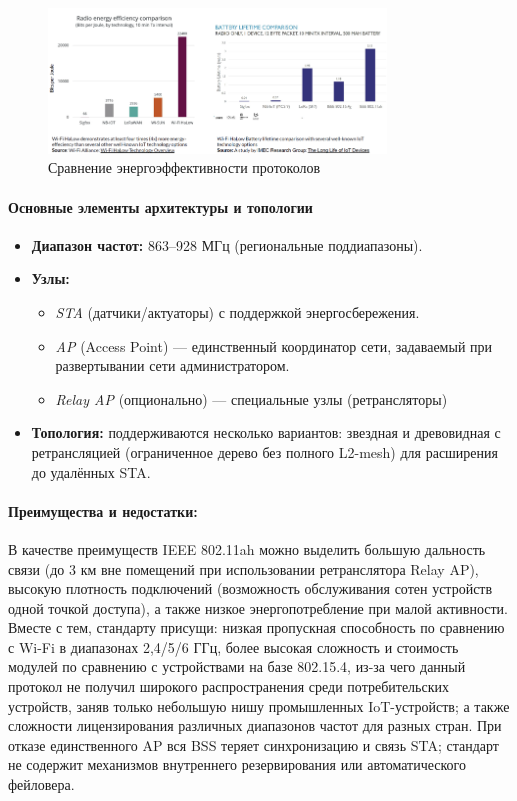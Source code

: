 \documentclass[a4paper,12pt]{article}
\begin{document}
\begin{figure}[h]
    \centering
    \includegraphics[width=0.8\textwidth]{images/WiFiEnergyEff.png}
    \caption{Сравнение энергоэффективности протоколов \cite{IMG_protocol_compare_power_eff}}
    \label{fig:wifi_energy_eff}
\end{figure}

\paragraph{Основные элементы архитектуры и топологии}
\begin{itemize}
  \item \textbf{Диапазон частот:} 863–928 МГц (региональные поддиапазоны).
  \item \textbf{Узлы:} 
    \begin{itemize}
      \item \emph{STA} (датчики/актуаторы) с поддержкой энергосбережения.
      \item \emph{AP} (Access Point) — единственный координатор сети, задаваемый при развертывании сети администратором.
      \item \emph{Relay AP} (опционально) — специальные узлы (ретрансляторы)
    \end{itemize}
  \item \textbf{Топология:} поддерживаются несколько вариантов: звездная и древовидная с ретрансляцией (ограниченное дерево без полного L2-mesh) для расширения до удалённых STA.
\end{itemize}

\paragraph{Преимущества и недостатки:}

В качестве преимуществ IEEE 802.11ah можно выделить большую дальность связи (до 3 км вне помещений при использовании ретранслятора Relay AP), высокую плотность подключений (возможность обслуживания сотен устройств одной точкой доступа), а также низкое энергопотребление при малой активности. Вместе с тем, стандарту присущи: низкая пропускная способность по сравнению с Wi-Fi в диапазонах 2,4/5/6 ГГц, более высокая сложность и стоимость модулей по сравнению с устройствами на базе 802.15.4, из-за чего данный протокол не получил широкого распространения среди потребительских устройств, заняв только небольшую нишу промышленных IoT-устройств; а также сложности лицензирования различных диапазонов частот для разных стран.
При отказе единственного AP вся BSS теряет синхронизацию и связь STA; стандарт не содержит механизмов внутреннего резервирования или автоматического фейловера.
\end{document}
